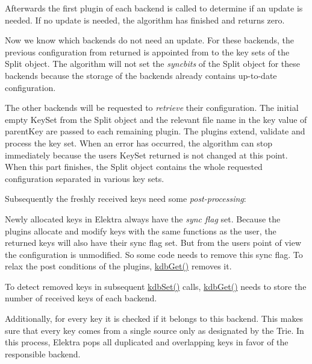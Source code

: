 Afterwards the first plugin of each backend is called to determine if an update is needed. If no update is needed, the algorithm has finished and returns zero.

Now we know which backends do not need an update. For these backends, the previous configuration from {\ttfamily returned} is appointed from to the key sets of the {\ttfamily Split} object. The algorithm will not set the {\itshape syncbits} of the {\ttfamily Split} object for these backends because the storage of the backends already contains up-\/to-\/date configuration.

The other backends will be requested to {\itshape retrieve} their configuration. The initial empty {\ttfamily Key\+Set} from the {\ttfamily Split} object and the relevant file name in the key value of {\ttfamily parent\+Key} are passed to each remaining plugin. The plugins extend, validate and process the key set. When an error has occurred, the algorithm can stop immediately because the user\textquotesingle{}s {\ttfamily Key\+Set} {\ttfamily returned} is not changed at this point. When this part finishes, the {\ttfamily Split} object contains the whole requested configuration separated in various key sets.

Subsequently the freshly received keys need some {\itshape post-\/processing}\+:


\begin{DoxyItemize}
\item Newly allocated keys in Elektra always have the {\itshape sync flag} set. Because the plugins allocate and modify keys with the same functions as the user, the returned keys will also have their sync flag set. But from the user\textquotesingle{}s point of view the configuration is unmodified. So some code needs to remove this sync flag. To relax the post conditions of the plugins, {\ttfamily \hyperlink{group__kdb_ga28e385fd9cb7ccfe0b2f1ed2f62453a1}{kdb\+Get()}} removes it.
\item To detect removed keys in subsequent {\ttfamily \hyperlink{group__kdb_ga11436b058408f83d303ca5e996832bcf}{kdb\+Set()}} calls, {\ttfamily \hyperlink{group__kdb_ga28e385fd9cb7ccfe0b2f1ed2f62453a1}{kdb\+Get()}} needs to store the number of received keys of each backend.
\item Additionally, for every key it is checked if it belongs to this backend. This makes sure that every key comes from a single source only as designated by the {\ttfamily Trie}. In this process, Elektra pops all duplicated and overlapping keys in favor of the responsible backend.
\end{DoxyItemize}

